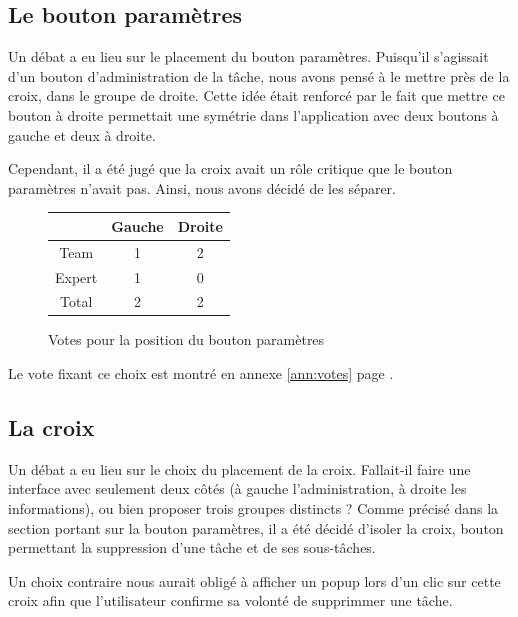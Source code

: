 \documentclass[11pt]{article}
\begin{document}
\subsection{Le bouton paramètres}
\label{subsec:paramPlacement}

Un débat a eu lieu sur le placement du bouton paramètres. Puisqu'il
s'agissait d'un bouton d'administration de la tâche, nous avons pensé
à le mettre près de la croix, dans le groupe de droite. Cette idée
était renforcé par le fait que mettre ce bouton à droite permettait
une symétrie dans l'application avec deux boutons à gauche et deux à
droite.

Cependant, il a été jugé que la croix avait un rôle critique que le
bouton paramètres n'avait pas. Ainsi, nous avons décidé de les
séparer.

\begin{figure}[!h]
  \centering
  \begin{tabular}[!h]{cc|c}
    & Gauche & Droite\\
    \hline
    Team & 1 & 2\\
    Expert & 1 & 0\\
    \hline
    Total & 2 & 2\\
  \end{tabular}
  \caption{Votes pour la position du bouton paramètres}
  \label{fig:voteparam}
\end{figure}

Le vote fixant ce choix est montré en annexe \ref{ann:votes} page \pageref{fig:paramvote}.



\subsection{La croix}
\label{subsec:croixPlacement}

Un débat a eu lieu sur le choix du placement de la croix. Fallait-il
faire une interface avec seulement deux côtés (à gauche
l'administration, à droite les informations), ou bien proposer trois
groupes distincts ? Comme précisé dans la section portant sur la
bouton paramètres, il a été décidé d'isoler la croix, bouton
permettant la suppression d'une tâche et de ses sous-tâches.

Un choix contraire nous aurait obligé à afficher un popup lors d'un
clic sur cette croix afin que l'utilisateur confirme sa volonté de
supprimmer une tâche.
\end{document}
